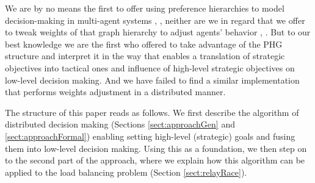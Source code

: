 We are by no means the first to offer using preference hierarchies to model decision-making in multi-agent systems \cite{cartvehishvili-2018-model}, \cite{drakaki-2018-intelligent}, neither are we in regard that we offer to tweak weights of that graph hierarchy to adjust agents' behavior \cite{zytniewski-2016-application}, \cite{brintrup-2010-behaviour}.
But to our best knowledge we are the first who offered to take advantage of the PHG structure and interpret it in the way that enables a translation of strategic objectives into tactical ones and influence of high-level strategic objectives on low-level decision making.
And we have failed to find a similar implementation that performs weights adjustment in a distributed manner.

The structure of this paper reads as follows.
We first describe the algorithm of distributed decision making (Sections \ref{sect:approachGen} and \ref{sect:approachFormal}) enabling setting high-level (strategic) goals and fusing them into low-level decision making.
Using this as a foundation, we then step on to the second part of the approach, where we explain how this algorithm can be applied to the load balancing problem (Section \ref{sect:relayRace}).
